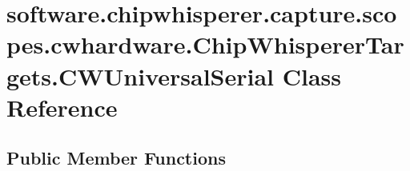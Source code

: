 \hypertarget{classsoftware_1_1chipwhisperer_1_1capture_1_1scopes_1_1cwhardware_1_1ChipWhispererTargets_1_1CWUniversalSerial}{}\section{software.\+chipwhisperer.\+capture.\+scopes.\+cwhardware.\+Chip\+Whisperer\+Targets.\+C\+W\+Universal\+Serial Class Reference}
\label{classsoftware_1_1chipwhisperer_1_1capture_1_1scopes_1_1cwhardware_1_1ChipWhispererTargets_1_1CWUniversalSerial}
\subsection*{Public Member Functions}
